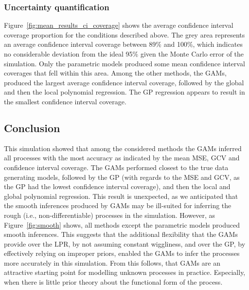 \documentclass[man, floatsintext]{apa7}
\begin{document}
\subsubsection{Uncertainty quantification}

Figure~\ref{fig:mean_results_ci_coverage} shows the average confidence interval
coverage proportion for the conditions described above. The grey area
represents an average confidence interval coverage between 89\% and 100\%,
which indicates no considerable deviation from the ideal 95\% given the Monte
Carlo error of the simulation. Only the parametric models produced some mean
confidence interval coverages that fell within this area. Among the other
methods, the GAMs, produced the largest average confidence interval coverage,
followed by the global and then the local polynomial regression. The GP
regression appears to result in the smallest confidence interval coverage.

\begin{sidewaysfigure*}[htbp]
  \caption{Average confidence interval coverage across all processes, analysis
    methods, and simulation conditions}
  \label{fig:mean_results_ci_coverage}
\end{sidewaysfigure*}

\subsection{Conclusion}

This simulation showed that among the considered methods the GAMs inferred all
processes with the most accuracy as indicated by the mean MSE, GCV and
confidence interval coverage. The GAMs performed closest to the true data
generating models, followed by the GP (with regards to the MSE and GCV, as
the GP had the lowest confidence interval coverage), and then the local and
global polynomial regression. This result is unexpected, as we anticipated that
the smooth inferences produced by GAMs may be ill-suited for inferring the
rough (i.e., non-differentiable) processes in the simulation. However, as
Figure~\ref{fig:smooth} shows, all methods except the parametric models
produced smooth inferences. This suggests that the additional flexibility that
the GAMs provide over the LPR, by not assuming constant wiggliness, and over
the GP, by effectively relying on improper priors, enabled the GAMs to infer
the processes more accurately in this simulation. From this follows, that GAMs
are an attractive starting point for modelling unknown processes in practice.
Especially, when there is little prior theory about the functional form of the
process.
\end{document}
